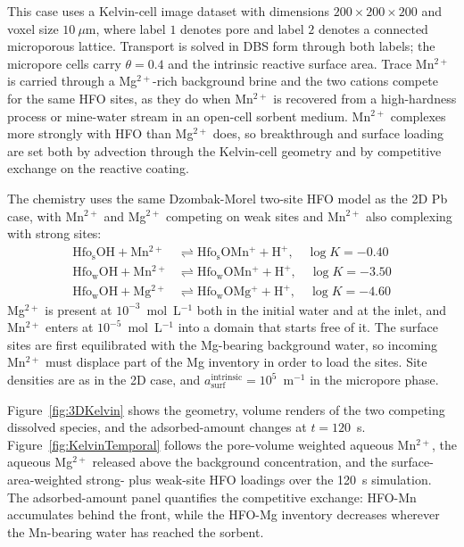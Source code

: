 This case uses a Kelvin-cell image dataset with dimensions
$200 \times 200 \times 200$ and voxel size $10~\mu\mathrm{m}$, where
label $1$ denotes pore and label $2$ denotes a connected microporous lattice.
Transport is solved in DBS form through both labels; the micropore cells carry
$\theta = 0.4$ and the intrinsic reactive surface area.
Trace Mn$^{2+}$ is carried through a Mg$^{2+}$-rich background brine and the
two cations compete for the same HFO sites, as they do when Mn$^{2+}$ is
recovered from a high-hardness process or mine-water stream in an open-cell
sorbent medium. Mn$^{2+}$ complexes more strongly with HFO than Mg$^{2+}$ does,
so breakthrough and surface loading are set both by advection through the
Kelvin-cell geometry and by competitive exchange on the reactive coating.

The chemistry uses the same Dzombak-Morel two-site HFO model as the 2D Pb
case, with Mn$^{2+}$ and Mg$^{2+}$ competing on weak sites and Mn$^{2+}$ also
complexing with strong sites:
\begin{align}
    \mathrm{Hfo_sOH} + \mathrm{Mn^{2+}} &\rightleftharpoons \mathrm{Hfo_sOMn^{+}} + \mathrm{H^{+}}, \quad \log K = -0.40 \\
    \mathrm{Hfo_wOH} + \mathrm{Mn^{2+}} &\rightleftharpoons \mathrm{Hfo_wOMn^{+}} + \mathrm{H^{+}}, \quad \log K = -3.50 \\
    \mathrm{Hfo_wOH} + \mathrm{Mg^{2+}} &\rightleftharpoons \mathrm{Hfo_wOMg^{+}} + \mathrm{H^{+}}, \quad \log K = -4.60
\end{align}
Mg$^{2+}$ is present at $10^{-3}$~mol~L$^{-1}$ both in the initial water and at
the inlet, and Mn$^{2+}$ enters at $10^{-5}$~mol~L$^{-1}$ into a domain that
starts free of it. The surface sites are first equilibrated with the Mg-bearing
background water, so incoming Mn$^{2+}$ must displace part of the Mg inventory
in order to load the sites. Site densities are as in the 2D case, and
$a_{\mathrm{surf}}^{\mathrm{intrinsic}} = 10^{5}$~m$^{-1}$ in the micropore phase.

Figure~\ref{fig:3DKelvin} shows the geometry, volume renders of the two
competing dissolved species, and the adsorbed-amount changes at $t = 120$~s.
Figure~\ref{fig:KelvinTemporal} follows the pore-volume weighted aqueous
Mn$^{2+}$, the aqueous Mg$^{2+}$ released above the background concentration,
and the surface-area-weighted strong- plus weak-site HFO loadings over the
120~s simulation. The adsorbed-amount panel quantifies the competitive
exchange: HFO-Mn accumulates behind the front, while the HFO-Mg inventory
decreases wherever the Mn-bearing water has reached the sorbent.

